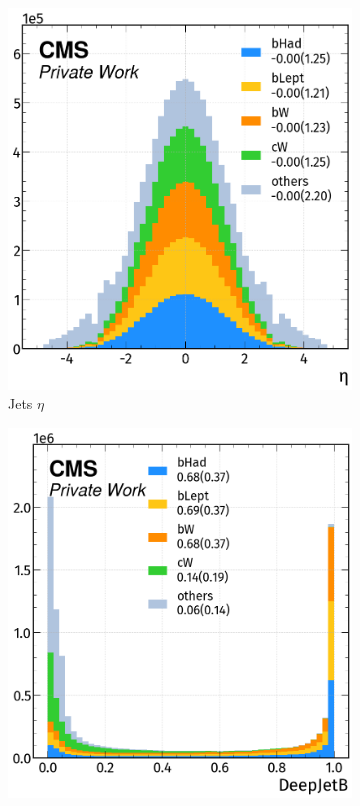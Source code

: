 \begin{figure}[H]
    \begin{subfigure}{0.42\linewidth}
        \hspace{0.15cm}
        \includegraphics[width=1\linewidth]{fig//chap08-kin_reco/jets/jet_eta.png}
        \caption{Jets $\eta$}
    \end{subfigure}
    \hfill
    \begin{subfigure}{0.435\linewidth}  
        \centering
        \includegraphics[width=1\linewidth]{fig//chap08-kin_reco/jets/jet_b.png}

\end{subfigure}
\end{figure}
